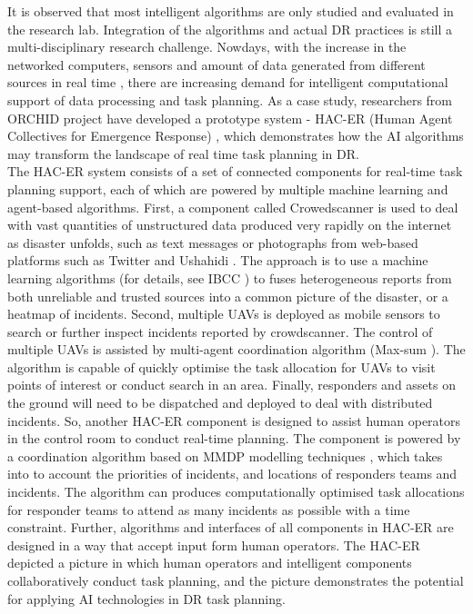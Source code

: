 It is observed that most intelligent algorithms are only studied and evaluated in the research lab. Integration of the algorithms and actual \ac{DR} practices is still a multi-disciplinary research challenge. Nowdays, with the increase in the networked computers, sensors and amount of data generated from different sources in real time \cite{Ramchurn2015}, there are increasing demand for intelligent computational support of data processing and task planning. As a case study, researchers from ORCHID project have developed a prototype system - HAC-ER (Human Agent Collectives for Emergence Response) \cite{Jennings2014,Ramchurn2015,Ramchurn2015a}, which demonstrates how the \ac{AI} algorithms may transform the landscape of real time task planning in \ac{DR}.\\

The \ac{HAC-ER} system consists of a set of connected components for real-time task planning support, each of which are powered by multiple machine learning and agent-based algorithms. First, a component called Crowedscanner is used to deal with vast quantities of unstructured data produced very rapidly on the internet as disaster unfolds, such as text messages or photographs from web-based platforms such as Twitter and Ushahidi \cite{Morrow2011}. The approach is to use a machine learning algorithms (for details, see IBCC \cite{Simpson}) to fuses heterogeneous reports from both unreliable and trusted sources into a common picture of the disaster, or a heatmap of incidents. Second, multiple  \acf{UAV}s is deployed as mobile sensors to search or further inspect incidents reported by crowdscanner. The control of multiple \ac{UAV}s is assisted by multi-agent coordination algorithm (Max-sum \cite{Ramchurn2010}). The algorithm is capable of quickly optimise the task allocation for \ac{UAV}s to visit points of interest or conduct search in an area.  Finally, responders and assets on the ground will need to be dispatched and deployed to deal with distributed incidents. So, another \ac{HAC-ER} component is designed to assist human operators in the control room to conduct real-time planning. The component is powered by a coordination algorithm based on MMDP modelling techniques \cite{Wu2015}, which takes into to account the priorities of incidents, and locations of responders teams and incidents. The algorithm can produces computationally optimised task allocations for responder teams to attend as many incidents as possible with a time constraint. Further, algorithms and interfaces of all components in \ac{HAC-ER} are designed in a way that accept input form human operators. The \ac{HAC-ER} depicted a picture in which human operators and intelligent components collaboratively conduct task planning, and the picture demonstrates the potential for applying \ac{AI} technologies in \ac{DR} task planning.\\

